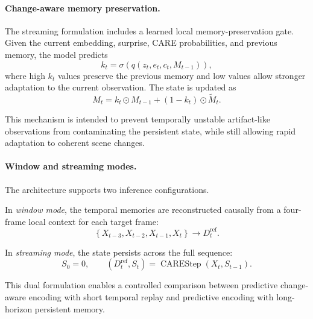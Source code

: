 \documentclass[11pt,a4paper]{article}
\begin{document}
\paragraph{Change-aware memory preservation.}
The streaming formulation includes a learned local memory-preservation gate.
Given the current embedding, surprise, CARE probabilities, and previous memory,
the model predicts
\begin{equation}
    k_t =
    \sigma
    \left(
        q
        \left(
            z_t,
            e_t,
            c_t,
            M_{t-1}
        \right)
    \right),
\end{equation}
where high $k_t$ values preserve the previous memory and low values allow
stronger adaptation to the current observation. The state is updated as
\begin{equation}
    M_t =
    k_t \odot M_{t-1}
    +
    \left(
        1-k_t
    \right)
    \odot
    \widetilde{M}_t.
\end{equation}

This mechanism is intended to prevent temporally unstable artifact-like
observations from contaminating the persistent state, while still allowing rapid
adaptation to coherent scene changes.

\paragraph{Window and streaming modes.}
The architecture supports two inference configurations.

In \emph{window mode}, the temporal memories are reconstructed causally from a
four-frame local context for each target frame:
\begin{equation}
    \left\{
        X_{t-3},
        X_{t-2},
        X_{t-1},
        X_t
    \right\}
    \rightarrow
    D_t^{\mathrm{ref}}.
\end{equation}

In \emph{streaming mode}, the state persists across the full sequence:
\begin{equation}
    S_0 = 0,
    \qquad
    \left(
        D_t^{\mathrm{ref}},
        S_t
    \right)
    =
    \operatorname{CAREStep}
    \left(
        X_t,
        S_{t-1}
    \right).
\end{equation}

This dual formulation enables a controlled comparison between predictive
change-aware encoding with short temporal replay and predictive encoding with
long-horizon persistent memory.
\end{document}
